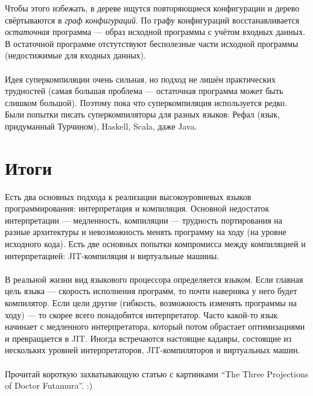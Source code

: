 \documentclass[11pt]{book}
\begin{document}
Чтобы этого избежать, в дереве ищутся повторяющиеся конфигурации и дерево свёртываются в \emph{граф конфигураций}.
По графу конфигураций восстанавливается \emph{остаточная} программа --- образ исходной программы с учётом входных данных.
В остаточной программе отстутствуют бесполезные части исходной программы (недостижимые для входных данных).
\\ \\
Идея суперкомпиляции очень сильная, но подход не лишён практических трудностей
(самая большая проблема --- остаточная программа может быть слишком большой).
Поэтому пока что суперкомпиляция используется редко.
Были попытки писать суперкомпиляторы для разных языков: Рефал (язык, придуманный Турчином), Haskell, Scala, даже Java.

\section{Итоги}
Есть два основных подхода к реализации высокоуровневых языков программирования: интерпретация и компиляция.
Основной недостаток интерпретации --- медленность,
компиляции --- трудность портирования на разные архитектуры и невозможность менять программу на ходу (на уровне исходного кода).
Есть две основных попытки компромисса между компиляцией и интерпретацией: JIT-компиляция и виртуальные машины.
\\ \\
В реальной жизни вид языкового процессора определяется языком.
Если главная цель языка --- скорость исполнения программ, то почти наверняка у него будет компилятор.
Если цели другие (гибкость, возможность изменять программы на ходу) --- то скорее всего понадобится интерпретатор.
Часто какой-то язык начинает с медленного интерпретатора, который потом обрастает оптимизациями и превращается в JIT.
Иногда встречаются настоящие кадавры, состоящие из нескольких уровней интерпретаторов, JIT-компиляторов и виртуальных машин.
\\ \\
Прочитай короткую захватывающую статью с картинками ``The Three Projections of Doctor Futamura''. :)
\end{document}
